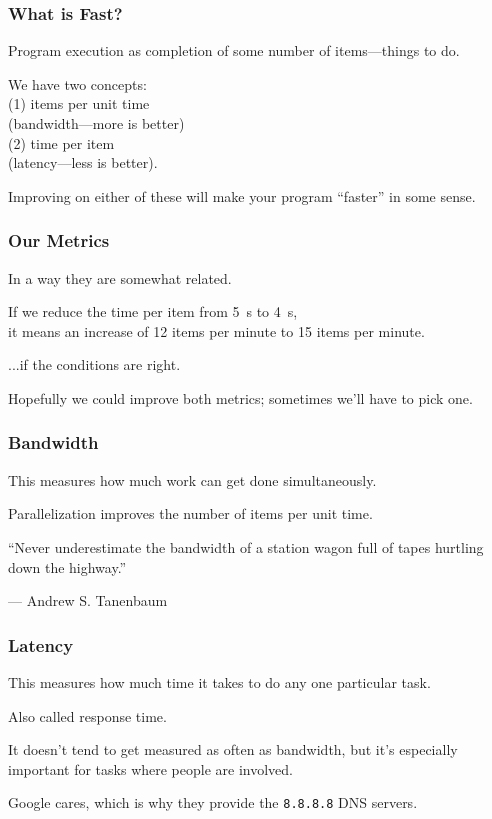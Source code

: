 \begin{frame}
\frametitle{What is Fast?}

\Large
Program execution as completion of some number of items---things to do. 

We have two concepts:\\
\quad (1) items per unit time \\
\qquad \qquad (bandwidth---more is better)\\
\quad (2) time per item \\
\qquad \qquad (latency---less is better). 

Improving on either of these will make your program ``faster'' in some sense.

\end{frame}

\begin{frame}
\frametitle{Our Metrics}
\Large
In a way they are somewhat related. 

If we reduce the time per item from 5~s to 4~s, \\
it means an increase of 12 items per minute to 15 items per minute.

\qquad ...if the conditions are right. 

Hopefully we could improve both metrics; sometimes we'll have to pick one.



\end{frame}

\begin{frame}
\frametitle{Bandwidth}

\Large
This measures how much work can get 
done simultaneously.

Parallelization improves the number
of items per unit time. 

``Never underestimate the bandwidth of a station wagon full of tapes hurtling down the highway.''

\hfill --- Andrew S. Tanenbaum

\end{frame}




\begin{frame}
\frametitle{Latency}

\Large
This measures how much time it takes to do
any one particular task.

Also called response time.

It doesn't tend to get measured as often as bandwidth, but it's especially
important for tasks where people are involved. 

Google cares, which is why they provide the {\tt 8.8.8.8} DNS servers.



\end{frame}


